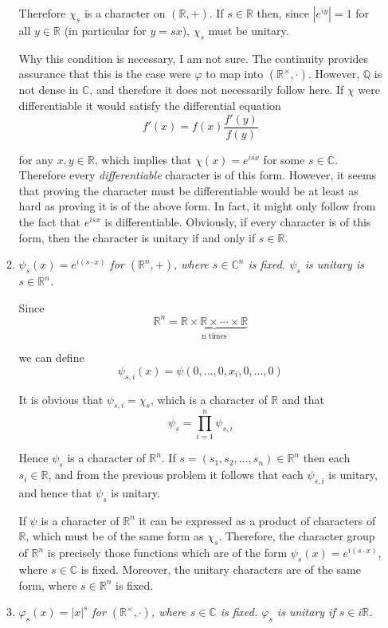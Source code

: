 \documentclass[letterpaper,11pt]{article}
\newcommand{\C}{\mathbb{C}}
\newcommand{\R}{\mathbb{R}}
\newcommand{\Q}{\mathbb{Q}}
\begin{document}
\begin{enumerate}
\begin{enumerate}
Therefore $\chi_s$ is a character on $(\R,+)$.  If $s \in \R$ then, since $|e^{iy}| = 1$ for all $y \in \R$ (in particular for $y = sx$), $\chi_s$ must be unitary.

Why this condition is necessary, I am not sure.  The continuity provides assurance that this is the case were $\varphi$ to map into $(\R^\times,\cdot)$.  However, $\Q$ is not dense in $\C$, and therefore it does not necessarily follow here.  If $\chi$ were differentiable it would satisfy the differential equation
\[
f'(x) = f(x) \frac{f'(y)}{f(y)}
\]

for any $x,y \in \R$, which implies that $\chi(x) = e^{isx}$ for some $s \in \C$.  Therefore every \emph{differentiable} character is of this form.  However, it seems that proving the character must be differentiable would be at least as hard as proving it is of the above form.  In fact, it might only follow from the fact that $e^{isx}$ is differentiable.  Obviously, if every character is of this form, then the character is unitary if and only if $s \in \R$.

\item \emph{$\psi_s(x) = e^{i(s \cdot x)}$ for $(\R^n, +)$, where $s \in \C^n$ is fixed.  $\psi_s$ is unitary is $s \in \R^n$.}

Since
\[
\R^n = \underbrace{\R \times \R \times \cdots \times \R}_{\mbox{n times}}
\]

we can define 
\[
\psi_{s,i}\left(x\right)=\psi\left(0,\ldots,0,x_i,0,\ldots,0\right)
\]

It is obvious that $\psi_{s,i} = \chi_s$, which is a character of $\R$ and that
\[
\psi_s = \prod_{i=1}^n \psi_{s,i}
\]

Hence $\psi_s$ is a character of $\R^n$.  If $s = (s_1,s_2,\ldots,s_n) \in \R^n$ then each $s_i \in \R$, and from the previous problem it follows that each $\psi_{s,i}$ is unitary, and hence that $\psi_s$ is unitary.

If $\psi$ is a character of $\R^n$ it can be expressed as a product of characters of $\R$, which must be of the same form as $\chi_s$.  Therefore, the character group of $\R^n$ is precisely those functions which are of the form $\psi_s(x) = e^{i(s \cdot x)}$, where $s \in \C$ is fixed.  Moreover, the unitary characters are of the same form, where $s \in \R^n$ is fixed.
 
\item \emph{$\varphi_s(x) = |x|^s$ for $(\R^\times, \cdot)$, where $s \in \C$ is fixed.  $\varphi_s$ is unitary if $s \in i\R$.}


\end{enumerate}
\end{enumerate}
\end{document}
